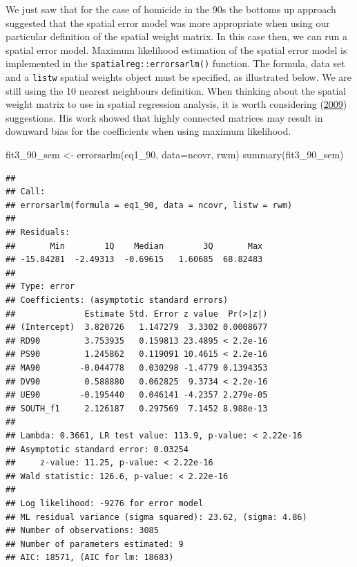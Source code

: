 \documentclass[
  krantz2]{krantz}
\makeatletter
\newenvironment{Shaded}{\begin{snugshade}}{\end{snugshade}}
\newcommand{\AttributeTok}[1]{\textcolor[rgb]{0.61,0.61,0.61}{#1}}
\newcommand{\FunctionTok}[1]{\textcolor[rgb]{0,0,0}{#1}}
\newcommand{\NormalTok}[1]{#1}
\newcommand{\OtherTok}[1]{\textcolor[rgb]{0.37,0.37,0.37}{#1}}
\newenvironment{kframe}{%
\medskip{}
\setlength{\fboxsep}{.8em}
 \def\at@end@of@kframe{}%
 \ifinner\ifhmode%
  \def\at@end@of@kframe{\end{minipage}}%
  \begin{minipage}{\columnwidth}%
 \fi\fi%
 \def\FrameCommand##1{\hskip\@totalleftmargin \hskip-\fboxsep
 \colorbox{shadecolor}{##1}\hskip-\fboxsep
     \hskip-\linewidth \hskip-\@totalleftmargin \hskip\columnwidth}%
 \MakeFramed {\advance\hsize-\width
   \@totalleftmargin\z@ \linewidth\hsize
   \@setminipage}}%
 {\par\unskip\endMakeFramed%
 \at@end@of@kframe}
\renewenvironment{Shaded}{\begin{kframe}}{\end{kframe}}
\makeatother
\begin{document}
We just saw that for the case of homicide in the 90s the bottoms up approach suggested that the spatial error model was more appropriate when using our particular definition of the spatial weight matrix. In this case then, we can run a spatial error model. Maximum likelihood estimation of the spatial error model is implemented in the \texttt{spatialreg::errorsarlm()} function. The formula, data set and a \texttt{listw} spatial weights object must be specified, as illustrated below. We are still using the 10 nearest neighbours definition. When thinking about the spatial weight matrix to use in spatial regression analysis, it is worth considering (\protect\hyperlink{ref-Smith_2009}{2009}) suggestions. His work showed that highly connected matrices may result in downward bias for the coefficients when using maximum likelihood.

\begin{Shaded}
\begin{Highlighting}[]
\NormalTok{fit3\_90\_sem }\OtherTok{\textless{}{-}} \FunctionTok{errorsarlm}\NormalTok{(eq1\_90, }\AttributeTok{data=}\NormalTok{ncovr, rwm)}
\FunctionTok{summary}\NormalTok{(fit3\_90\_sem)}
\end{Highlighting}
\end{Shaded}

\begin{verbatim}
## 
## Call:
## errorsarlm(formula = eq1_90, data = ncovr, listw = rwm)
## 
## Residuals:
##       Min        1Q    Median        3Q       Max 
## -15.84281  -2.49313  -0.69615   1.60685  68.82483 
## 
## Type: error 
## Coefficients: (asymptotic standard errors) 
##              Estimate Std. Error z value  Pr(>|z|)
## (Intercept)  3.820726   1.147279  3.3302 0.0008677
## RD90         3.753935   0.159813 23.4895 < 2.2e-16
## PS90         1.245862   0.119091 10.4615 < 2.2e-16
## MA90        -0.044778   0.030298 -1.4779 0.1394353
## DV90         0.588880   0.062825  9.3734 < 2.2e-16
## UE90        -0.195440   0.046141 -4.2357 2.279e-05
## SOUTH_f1     2.126187   0.297569  7.1452 8.988e-13
## 
## Lambda: 0.3661, LR test value: 113.9, p-value: < 2.22e-16
## Asymptotic standard error: 0.03254
##     z-value: 11.25, p-value: < 2.22e-16
## Wald statistic: 126.6, p-value: < 2.22e-16
## 
## Log likelihood: -9276 for error model
## ML residual variance (sigma squared): 23.62, (sigma: 4.86)
## Number of observations: 3085 
## Number of parameters estimated: 9 
## AIC: 18571, (AIC for lm: 18683)
\end{verbatim}
\end{document}
